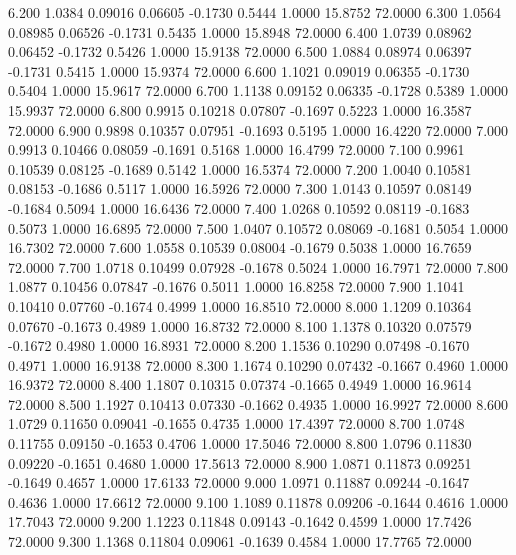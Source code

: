    6.200   1.0384   0.09016   0.06605  -0.1730   0.5444   1.0000  15.8752  72.0000
   6.300   1.0564   0.08985   0.06526  -0.1731   0.5435   1.0000  15.8948  72.0000
   6.400   1.0739   0.08962   0.06452  -0.1732   0.5426   1.0000  15.9138  72.0000
   6.500   1.0884   0.08974   0.06397  -0.1731   0.5415   1.0000  15.9374  72.0000
   6.600   1.1021   0.09019   0.06355  -0.1730   0.5404   1.0000  15.9617  72.0000
   6.700   1.1138   0.09152   0.06335  -0.1728   0.5389   1.0000  15.9937  72.0000
   6.800   0.9915   0.10218   0.07807  -0.1697   0.5223   1.0000  16.3587  72.0000
   6.900   0.9898   0.10357   0.07951  -0.1693   0.5195   1.0000  16.4220  72.0000
   7.000   0.9913   0.10466   0.08059  -0.1691   0.5168   1.0000  16.4799  72.0000
   7.100   0.9961   0.10539   0.08125  -0.1689   0.5142   1.0000  16.5374  72.0000
   7.200   1.0040   0.10581   0.08153  -0.1686   0.5117   1.0000  16.5926  72.0000
   7.300   1.0143   0.10597   0.08149  -0.1684   0.5094   1.0000  16.6436  72.0000
   7.400   1.0268   0.10592   0.08119  -0.1683   0.5073   1.0000  16.6895  72.0000
   7.500   1.0407   0.10572   0.08069  -0.1681   0.5054   1.0000  16.7302  72.0000
   7.600   1.0558   0.10539   0.08004  -0.1679   0.5038   1.0000  16.7659  72.0000
   7.700   1.0718   0.10499   0.07928  -0.1678   0.5024   1.0000  16.7971  72.0000
   7.800   1.0877   0.10456   0.07847  -0.1676   0.5011   1.0000  16.8258  72.0000
   7.900   1.1041   0.10410   0.07760  -0.1674   0.4999   1.0000  16.8510  72.0000
   8.000   1.1209   0.10364   0.07670  -0.1673   0.4989   1.0000  16.8732  72.0000
   8.100   1.1378   0.10320   0.07579  -0.1672   0.4980   1.0000  16.8931  72.0000
   8.200   1.1536   0.10290   0.07498  -0.1670   0.4971   1.0000  16.9138  72.0000
   8.300   1.1674   0.10290   0.07432  -0.1667   0.4960   1.0000  16.9372  72.0000
   8.400   1.1807   0.10315   0.07374  -0.1665   0.4949   1.0000  16.9614  72.0000
   8.500   1.1927   0.10413   0.07330  -0.1662   0.4935   1.0000  16.9927  72.0000
   8.600   1.0729   0.11650   0.09041  -0.1655   0.4735   1.0000  17.4397  72.0000
   8.700   1.0748   0.11755   0.09150  -0.1653   0.4706   1.0000  17.5046  72.0000
   8.800   1.0796   0.11830   0.09220  -0.1651   0.4680   1.0000  17.5613  72.0000
   8.900   1.0871   0.11873   0.09251  -0.1649   0.4657   1.0000  17.6133  72.0000
   9.000   1.0971   0.11887   0.09244  -0.1647   0.4636   1.0000  17.6612  72.0000
   9.100   1.1089   0.11878   0.09206  -0.1644   0.4616   1.0000  17.7043  72.0000
   9.200   1.1223   0.11848   0.09143  -0.1642   0.4599   1.0000  17.7426  72.0000
   9.300   1.1368   0.11804   0.09061  -0.1639   0.4584   1.0000  17.7765  72.0000
